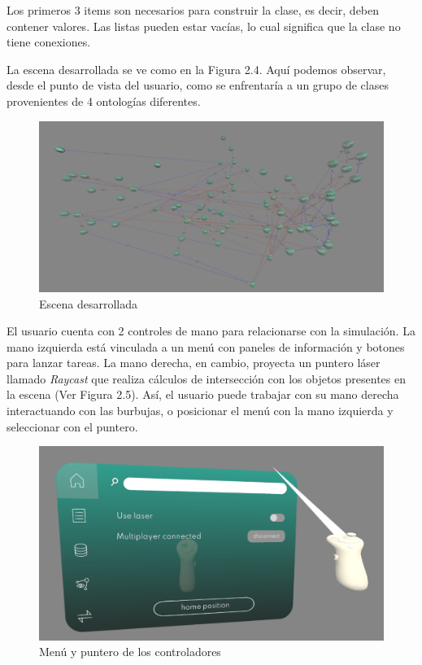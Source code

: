 Los primeros 3 items son necesarios para construir la clase, es decir, deben contener valores. Las listas pueden estar vacías, lo cual significa que la clase no tiene conexiones.



La escena desarrollada se ve como en la Figura 2.4. Aquí podemos observar, desde el punto de vista del usuario, como se enfrentaría a un grupo de clases provenientes de 4 ontologías diferentes.

\begin{figure}[ht]
   \begin{center}
      \includegraphics[width=0.8\linewidth]{chapter2/figures/ontology_project.png}
   \end{center}
   \caption[Escena desarrollada]
   {\footnotesize Escena desarrollada}
\end{figure}

El usuario cuenta con 2 controles de mano para relacionarse con la simulación. La mano izquierda está vinculada a un menú con paneles de información y botones para lanzar tareas. La mano derecha, en cambio, proyecta un puntero láser llamado \textit{Raycast} que realiza cálculos de intersección con los objetos presentes en la escena (Ver Figura 2.5). Así, el usuario puede trabajar con su mano derecha interactuando con las burbujas, o posicionar el menú con la mano izquierda y seleccionar con el puntero.

\begin{figure}[ht]
   \begin{center}
      \includegraphics[width=0.6\linewidth]{chapter2/figures/controllers.png}
   \end{center}
   \caption[Menú y puntero de los controladores]
   {\footnotesize Menú y puntero de los controladores}
\end{figure}

